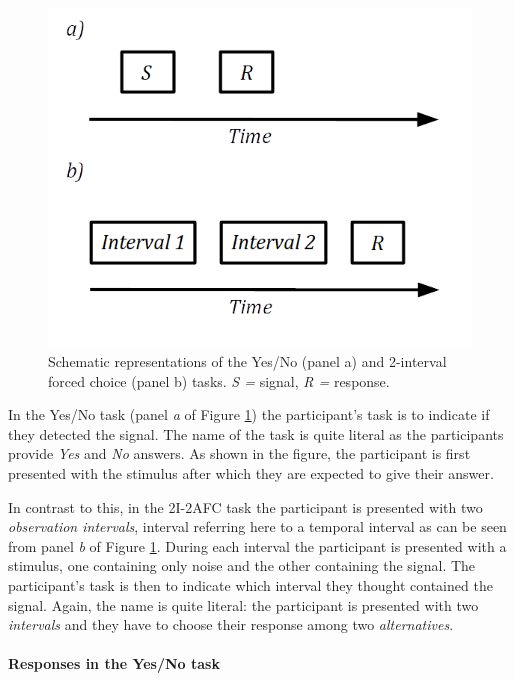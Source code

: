 \documentclass{article}\usepackage{knitr}
\begin{document}
\begin{figure}[!htb]
\centering
\includegraphics[scale = 0.5]{YesNoAfc}
\caption{Schematic representations of the Yes/No (panel a) and 2-interval forced choice (panel b) tasks. \textit{S = } signal, \textit{R =} response.}
\label{fig:YesNoAfc}
\end{figure}

In the Yes/No task (panel \textit{a} of Figure \ref{fig:YesNoAfc}) the participant's task is to indicate if they detected the signal. The name of the task is quite literal as the participants provide \textit{Yes} and \textit{No} answers. As shown in the figure, the participant is first presented with the stimulus after which they are expected to give their answer.

In contrast to this, in the 2I-2AFC task the participant is presented with two \textit{observation intervals}, interval referring here to a temporal interval as can be seen from panel \textit{b} of Figure \ref{fig:YesNoAfc}. During each interval the participant is presented with a stimulus, one containing only noise and the other containing the signal. The participant's task is then to indicate which interval they thought contained the signal. Again, the name is quite literal: the participant is presented with two \textit{intervals} and they have to choose their response among two \textit{alternatives}.

\paragraph{Responses in the Yes/No task}
\end{document}
